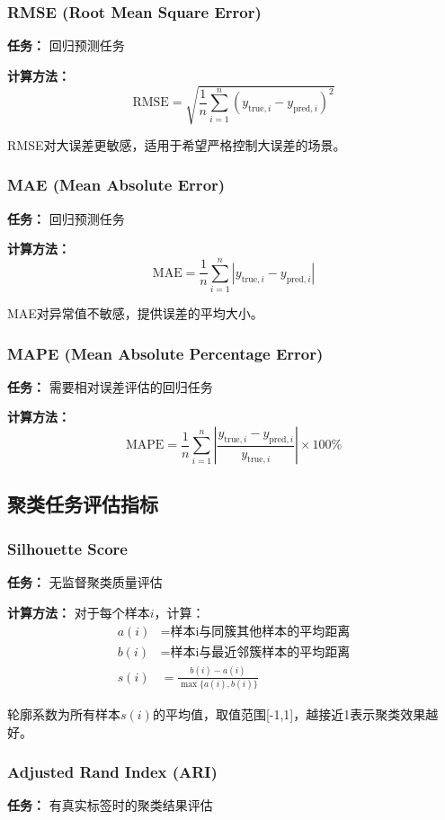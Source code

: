 \documentclass[a4paper]{article}
\begin{document}
\subsubsection{RMSE (Root Mean Square Error)}
\textbf{任务：} 回归预测任务

\textbf{计算方法：}
$$\text{RMSE} = \sqrt{\frac{1}{n}\sum_{i=1}^{n}(y_{\text{true},i} - y_{\text{pred},i})^2}$$

RMSE对大误差更敏感，适用于希望严格控制大误差的场景。

\subsubsection{MAE (Mean Absolute Error)}
\textbf{任务：} 回归预测任务

\textbf{计算方法：}
$$\text{MAE} = \frac{1}{n}\sum_{i=1}^{n}|y_{\text{true},i} - y_{\text{pred},i}|$$

MAE对异常值不敏感，提供误差的平均大小。

\subsubsection{MAPE (Mean Absolute Percentage Error)}
\textbf{任务：} 需要相对误差评估的回归任务

\textbf{计算方法：}
$$\text{MAPE} = \frac{1}{n}\sum_{i=1}^{n}\left|\frac{y_{\text{true},i} - y_{\text{pred},i}}{y_{\text{true},i}}\right| \times 100\%$$

\subsection{聚类任务评估指标}

\subsubsection{Silhouette Score}
\textbf{任务：} 无监督聚类质量评估

\textbf{计算方法：} 对于每个样本$i$，计算：
\begin{align}
a(i) &= \text{样本i与同簇其他样本的平均距离} \\
b(i) &= \text{样本i与最近邻簇样本的平均距离} \\
s(i) &= \frac{b(i) - a(i)}{\max\{a(i), b(i)\}}
\end{align}

轮廓系数为所有样本$s(i)$的平均值，取值范围[-1,1]，越接近1表示聚类效果越好。

\subsubsection{Adjusted Rand Index (ARI)}
\textbf{任务：} 有真实标签时的聚类结果评估
\end{document}
